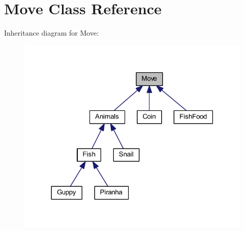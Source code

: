 \hypertarget{class_move}{}\section{Move Class Reference}
\label{class_move}


Inheritance diagram for Move\+:
\nopagebreak
\begin{figure}[H]
\begin{center}
\leavevmode
\includegraphics[width=318pt]{class_move__inherit__graph}
\end{center}
\end{figure}
